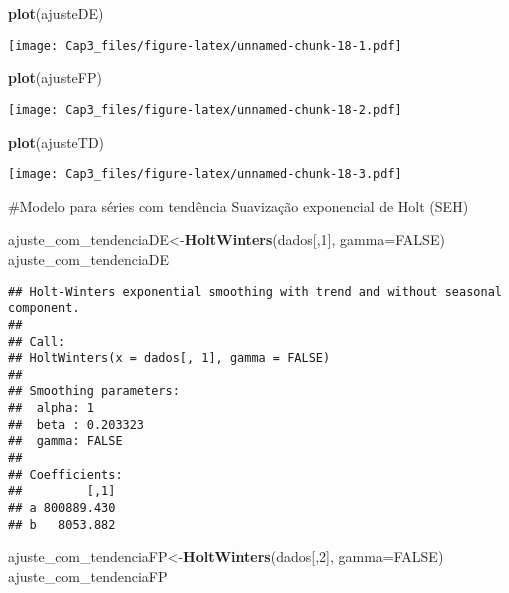 \documentclass[]{article}
\newenvironment{Shaded}{\begin{snugshade}}{\end{snugshade}}
\newcommand{\DataTypeTok}[1]{\textcolor[rgb]{0.13,0.29,0.53}{#1}}
\newcommand{\DecValTok}[1]{\textcolor[rgb]{0.00,0.00,0.81}{#1}}
\newcommand{\KeywordTok}[1]{\textcolor[rgb]{0.13,0.29,0.53}{\textbf{#1}}}
\newcommand{\NormalTok}[1]{#1}
\newcommand{\OtherTok}[1]{\textcolor[rgb]{0.56,0.35,0.01}{#1}}
\begin{document}
\begin{Shaded}
\begin{Highlighting}[]
\KeywordTok{plot}\NormalTok{(ajusteDE)}
\end{Highlighting}
\end{Shaded}

\texttt{[image: Cap3\_files/figure-latex/unnamed-chunk-18-1.pdf]}

\begin{Shaded}
\begin{Highlighting}[]
\KeywordTok{plot}\NormalTok{(ajusteFP)}
\end{Highlighting}
\end{Shaded}

\texttt{[image: Cap3\_files/figure-latex/unnamed-chunk-18-2.pdf]}

\begin{Shaded}
\begin{Highlighting}[]
\KeywordTok{plot}\NormalTok{(ajusteTD)}
\end{Highlighting}
\end{Shaded}

\texttt{[image: Cap3\_files/figure-latex/unnamed-chunk-18-3.pdf]}

\#Modelo para séries com tendência Suavização exponencial de Holt (SEH)

\begin{Shaded}
\begin{Highlighting}[]
\NormalTok{ajuste_com_tendenciaDE<-}\KeywordTok{HoltWinters}\NormalTok{(dados[,}\DecValTok{1}\NormalTok{], }\DataTypeTok{gamma=}\OtherTok{FALSE}\NormalTok{)}
\NormalTok{ajuste_com_tendenciaDE}
\end{Highlighting}
\end{Shaded}

\begin{verbatim}
## Holt-Winters exponential smoothing with trend and without seasonal component.
## 
## Call:
## HoltWinters(x = dados[, 1], gamma = FALSE)
## 
## Smoothing parameters:
##  alpha: 1
##  beta : 0.203323
##  gamma: FALSE
## 
## Coefficients:
##         [,1]
## a 800889.430
## b   8053.882
\end{verbatim}

\begin{Shaded}
\begin{Highlighting}[]
\NormalTok{ajuste_com_tendenciaFP<-}\KeywordTok{HoltWinters}\NormalTok{(dados[,}\DecValTok{2}\NormalTok{], }\DataTypeTok{gamma=}\OtherTok{FALSE}\NormalTok{)}
\NormalTok{ajuste_com_tendenciaFP}
\end{Highlighting}
\end{Shaded}
\end{document}
